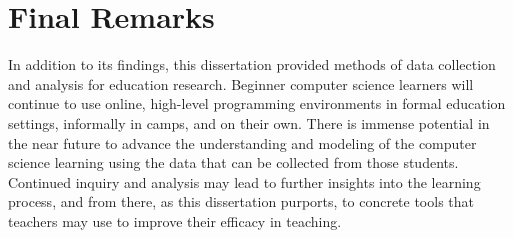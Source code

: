 \section{Final Remarks}
In addition to its findings, this dissertation provided methods of data collection and analysis for education research. Beginner computer science learners will continue to use online, high-level programming environments in formal education settings, informally in camps, and on their own. There is immense potential in the near future to advance the understanding and modeling of the computer science learning using the data that can be collected from those students. Continued inquiry and analysis may lead to further insights into the learning process, and from there, as this dissertation purports, to concrete tools that teachers may use to improve their efficacy in teaching. 


